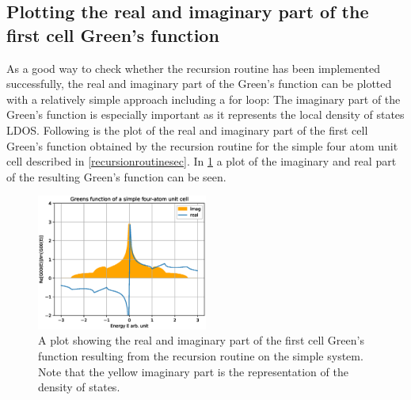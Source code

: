 \subsection{Plotting the real and imaginary part of the first cell Green's function}
As a good way to check whether the recursion routine has been implemented successfully, the real and imaginary part of the Green's function can be plotted with a relatively simple approach including a for loop:
The imaginary part of the Green's function is especially important as it represents the local density of states LDOS. Following is the plot of the real and imaginary part of the first cell Green's function obtained by the recursion routine for the simple four atom unit cell described in \cref{recursionroutinesec}. In \cref{imrealplot} a plot of the imaginary and real part of the resulting Green's function can be seen. 
\begin{figure}
    \centering
    \includegraphics[width = 0.5\textwidth]{Figures/imrealplot.eps}
    \caption{A plot showing the real and imaginary part of the first cell Green's function resulting from the recursion routine on the simple system. Note that the yellow imaginary part is the representation of the density of states.}
    \label{imrealplot}
\end{figure}
